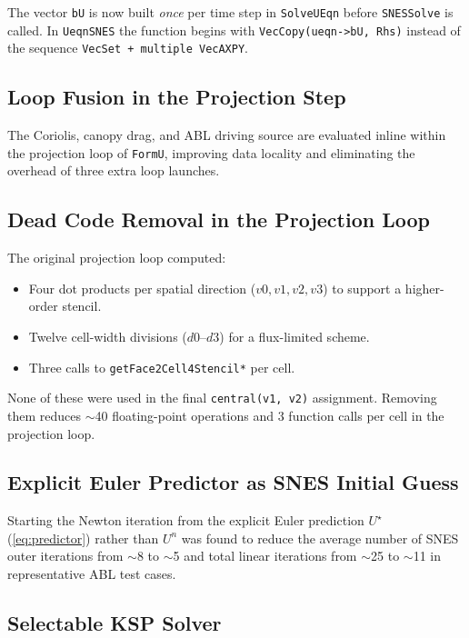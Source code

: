 \documentclass[12pt,a4paper]{article}
\begin{document}
	The vector \texttt{bU} is now built \emph{once} per time step in
	\texttt{SolveUEqn} before \texttt{SNESSolve} is called.
	In \texttt{UeqnSNES} the function begins with
	\texttt{VecCopy(ueqn->bU, Rhs)} instead of the sequence
	\texttt{VecSet + multiple VecAXPY}.
	
	\subsection{Loop Fusion in the Projection Step}
	
	The Coriolis, canopy drag, and ABL driving source are evaluated inline
	within the projection loop of \texttt{FormU}, improving data locality
	and eliminating the overhead of three extra loop launches.
	
	\subsection{Dead Code Removal in the Projection Loop}
	
	The original projection loop computed:
	\begin{itemize}
		\item Four dot products per spatial direction ($v0, v1, v2, v3$) to
		support a higher-order stencil.
		\item Twelve cell-width divisions ($d0$--$d3$) for a flux-limited
		scheme.
		\item Three calls to \texttt{getFace2Cell4Stencil*} per cell.
	\end{itemize}
	None of these were used in the final \texttt{central(v1, v2)} assignment.
	Removing them reduces $\sim$40 floating-point operations and 3 function
	calls per cell in the projection loop.
	
	\subsection{Explicit Euler Predictor as SNES Initial Guess}
	
	Starting the Newton iteration from the explicit Euler prediction
	$U^\star$ (\eqref{eq:predictor}) rather than $U^n$ was found to reduce
	the average number of SNES outer iterations from $\sim$8 to $\sim$5
	and total linear iterations from $\sim$25 to $\sim$11 in representative
	ABL test cases.
	
	\subsection{Selectable KSP Solver}
\end{document}
